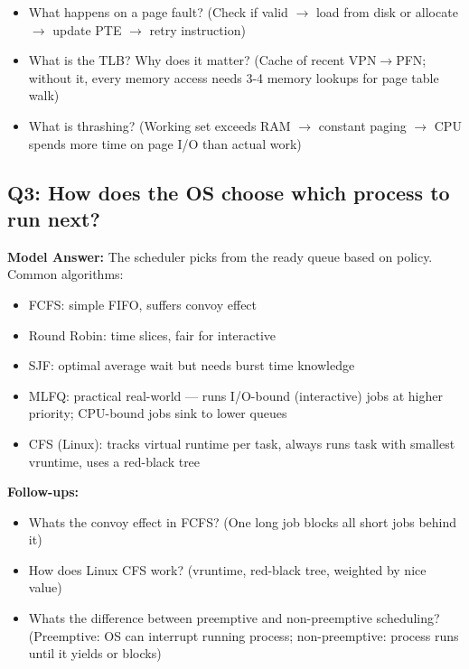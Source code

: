 \documentclass[11pt]{article}
\providecommand{\tightlist}{\setlength{\itemsep}{1pt}\setlength{\parskip}{0pt}}
\begin{document}
\begin{itemize}
\tightlist
\item
  What happens on a page fault? (Check if valid \(\rightarrow\) load from disk or allocate \(\rightarrow\) update PTE \(\rightarrow\) retry instruction)
\item
  What is the TLB? Why does it matter? (Cache of recent VPN\(\rightarrow\)PFN; without it, every memory access needs 3-4 memory lookups for page table walk)
\item
  What is thrashing? (Working set exceeds RAM \(\rightarrow\) constant paging \(\rightarrow\) CPU spends more time on page I/O than actual work)
\end{itemize}

\subsection{Q3: How does the OS choose which process to run next?}\label{q3-how-does-the-os-choose-which-process-to-run-next}

\textbf{Model Answer:} The scheduler picks from the ready queue based on policy. Common algorithms:

\begin{itemize}
\tightlist
\item
  FCFS: simple FIFO, suffers convoy effect
\item
  Round Robin: time slices, fair for interactive
\item
  SJF: optimal average wait but needs burst time knowledge
\item
  MLFQ: practical real-world --- runs I/O-bound (interactive) jobs at higher priority; CPU-bound jobs sink to lower queues
\item
  CFS (Linux): tracks virtual runtime per task, always runs task with smallest vruntime, uses a red-black tree
\end{itemize}

\textbf{Follow-ups:}

\begin{itemize}
\tightlist
\item
  What\textquotesingle s the convoy effect in FCFS? (One long job blocks all short jobs behind it)
\item
  How does Linux CFS work? (vruntime, red-black tree, weighted by nice value)
\item
  What\textquotesingle s the difference between preemptive and non-preemptive scheduling? (Preemptive: OS can interrupt running process; non-preemptive: process runs until it yields or blocks)
\end{itemize}
\end{document}
